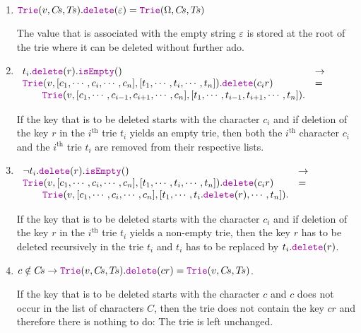 \begin{enumerate}
\item $\mytt{Trie}(v,C\!s,T\!s).\mytt{delete}(\varepsilon) = \mytt{Trie}(\Omega,C\!s,T\!s)$

      The value that is associated with the empty  string $\varepsilon$ is stored at the root of the
      trie where it can be deleted without further ado.
\item $\begin{array}[t]{ll}
       t_i.\mytt{delete}(r).\mytt{isEmpty}()   & \rightarrow \\
       \mytt{Trie}(v, [c_1,\cdots,c_i,\cdots,c_n],[t_1,\cdots,t_i,\cdots,t_n]).\mytt{delete}(c_ir) 
       & = \\
       \qquad 
       \mytt{Trie}(v, [c_1,\cdots,c_{i-1},c_{i+1},\cdots,c_n],[t_1,\cdots,t_{i-1},t_{i+1},\cdots,t_n]).
       \end{array}
       $

       If  the key that is to be deleted starts with the character $c_i$ and if deletion of  the key
       $r$ in the $i^\textrm{th}$  trie $t_i$ yields an empty
       trie, then both the $i^\textrm{th}$ character $c_i$ and the $i^\textrm{th}$ trie $t_i$ are removed from
       their respective lists.
\item $\begin{array}[t]{ll}
       \neg t_i.\mytt{delete}(r).\mytt{isEmpty}()   & \rightarrow \\
       \mytt{Trie}(v, [c_1,\cdots,c_i,\cdots,c_n],[t_1,\cdots,t_i,\cdots,t_n]).\mytt{delete}(c_ir) 
       & = \\
       \qquad \mytt{Trie}(v, [c_1,\cdots,c_i,\cdots,c_n],[t_1,\cdots,t_i.\mytt{delete}(r),\cdots,t_n]).
       \end{array}
       $

       If  the key that is to be deleted starts with the character $c_i$ and if deletion of  the key
       $r$ in the $i^\textrm{th}$  trie $t_i$ yields a non-empty trie, then the key $r$ has to be deleted recursively
       in the trie $t_i$ and $t_i$ has to be replaced by $t_i.\mytt{delete}(r)$.
\item $c \notin C\!s \rightarrow \mytt{Trie}(v, C\!s, T\!s).\mytt{delete}(cr) =
       \mytt{Trie}(v, C\!s, T\!s)$. 
       
       If  the key that is to be deleted starts with the character $c$ and $c$ does not occur in
       the list of characters $C$, then the trie does not contain the key $cr$ and therefore there
       is nothing to do:  The trie is left unchanged.
\end{enumerate}


